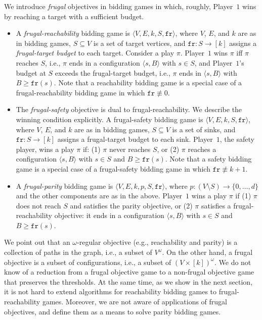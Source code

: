 \documentclass{theoretics}
\newcommand{\PO}{Player~$1$\xspace}
\newcommand{\fr}{\texttt{fr}}
\newcommand{\zug}[1]{\langle #1  \rangle}
\renewcommand{\set}[1]{\{ #1  \}}
\begin{document}
We introduce {\em frugal} objectives in bidding games in which, roughly, \PO wins by reaching a target with a sufficient budget.
\begin{definition}
\mbox{}\newline
\begin{itemize}
\item A {\em frugal-reachability} bidding game is $\zug{V, E, k, S, \fr}$, where $V$, $E$, and $k$ are as in bidding games, $S \subseteq V$ is a set of target vertices, and $\fr:S \rightarrow [k]$ assigns a {\em frugal-target budget} to each target. Consider a play $\pi$. 
 \PO wins $\pi$ iff $\pi$ reaches $S$, i.e., $\pi$ ends in a configuration \(\zug{s, B}\) with \(s \in S\), and \PO's budget at $S$ exceeds the frugal-target budget, i.e., $\pi$ ends in \(\zug{s, B}\) with $B \geq \fr(s)$. Note that a reachability bidding game is a special case of a frugal-reachability bidding game in which $\fr \nequiv 0$. 
\item The {\em frugal-safety} objective is dual to frugal-reachability. We describe the winning condition explicitly. A frugal-safety bidding game is $\zug{V, E, k, S, \fr}$, where $V$, $E$, and $k$ are as in bidding games, $S \subseteq V$ is a set of sinks, and $\fr:S \rightarrow [k]$ assigns a frugal-target budget to each sink. \PO, the safety player, wins a play $\pi$ if: (1) $\pi$ never reaches $S$, or (2) $\pi$ reaches a configuration $\zug{s, B}$ with $s \in S$ and $B \geq \fr(s)$. Note that a safety bidding game is a special case of a frugal-safety bidding game in which $\fr \nequiv k+1$. 
\item A {\em frugal-parity} bidding game is $\zug{V, E, k, p, S, \fr}$, where $p: (V \setminus S) \rightarrow \set{0,\ldots, d}$ and the other components are as in the above. \PO wins a play $\pi$ if (1) $\pi$ does not reach $S$ and satisfies the parity objective, or (2) $\pi$ satisfies a frugal-reachability objective: it ends in a configuration $\zug{s, B}$ with $s \in S$ and $B \geq \fr(s)$.
\end{itemize}
\end{definition}

\begin{remark}
We point out that an $\omega$-regular objective (e.g., reachability and parity) is a collection of paths in the graph, i.e., a subset of $V^\omega$. On the other hand, a frugal objective is a subset of configurations, i.e., a subset of $(V \times [k])^\omega$. We do not know of a reduction from a frugal objective game to a non-frugal objective game that preserves the thresholds. At the same time, as we show in the next section, it is not hard to extend algorithms for reachability bidding games to frugal-reachability games. Moreover, we are not aware of applications of frugal objectives, and define them as a means to solve parity bidding games. 
\end{remark}
\end{document}

